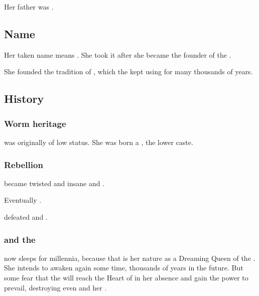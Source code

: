 Her father was . 







\subsection{Name}
Her taken name \quo{\Kserasshana} means . 
She took it after she became the founder of the \dzraicchenosses. 

She founded the tradition of , which the \dragons{} kept using for many thousands of years. 






\subsection{History}





\subsubsection{Worm heritage}
\Tiamat was originally of low status. 
She was born a , the \Caisith lower caste.





\subsubsection{Rebellion}
\Tiamat became twisted and insane and . 

Eventually \Tiamat {}. 

\Sethicus defeated \Tiamat and .





\subsubsection{\Xserasshana{} and the \firstgendragons}
\Tiamat{} now sleeps for millennia, 
because that is her nature as a Dreaming Queen of the \ophidians{}. She intends to awaken again some time, thousands of years in the future. But some \dragons{} fear that the \banes{} will reach the Heart of \Miith{} in her absence and gain the power to prevail, destroying even \Tiamat{} and her \firstgendragons. 

